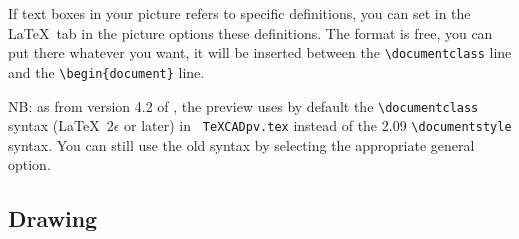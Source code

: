 \documentclass[11pt,a4paper]{article}
\begin{document}
If text boxes in your picture refers to specific definitions, you
can set in the \LaTeX \, tab in the picture options these
definitions. The format is free, you can put there whatever you
want, it will be inserted between the \verb+\documentclass+ line
and the \verb+\begin{document}+ line.

NB: as from version 4.2 of \TC, the preview uses by default the
\verb+\documentclass+ syntax (\LaTeX\, $2\epsilon$ or later) in {\tt
TeXCADpv.tex} instead of the 2.09 \verb+\documentstyle+ syntax.
You can still use the old syntax by selecting the appropriate
general option.

\subsection{Drawing}
\end{document}
